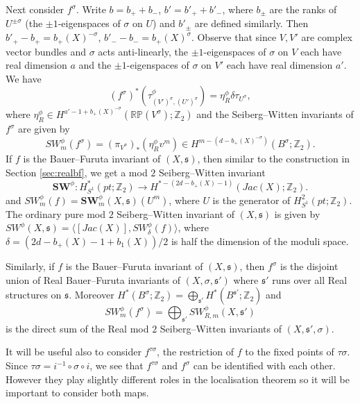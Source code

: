 \documentclass{amsart}
\theoremstyle{definition}
\theoremstyle{remark}
\numberwithin{equation}{section}
\begin{document}
Next consider $f^\sigma$. Write $b = b_+ + b_-$, $b' = b'_+ + b'_-$, where $b_{\pm}$ are the ranks of $U^{\pm \sigma}$ (the $\pm 1$-eigenspaces of $\sigma$ on $U$) and $b'_{\pm}$ are defined similarly. Then $b'_+ - b_+ = b_+(X)^{-\sigma}$, $b'_- - b_- = b_+(X)^{\sigma}$. Observe that since $V,V'$ are complex vector bundles and $\sigma$ acts anti-linearly, the $\pm 1$-eigenspaces of $\sigma$ on $V$ each have real dimension $a$ and the $\pm 1$-eigenspaces of $\sigma$ on $V'$ each have real dimension $a'$. We have 
\[
(f^\sigma)^*( \tau^\phi_{(V')^\sigma , (U')^\sigma} ) = \eta^\phi_R \delta \tau_{U^\sigma},
\]
where $\eta^\phi_R \in H^{a'-1+b_+(X)^{-\sigma}}( \mathbb{RP}(V^\sigma) ; \mathbb{Z}_2)$ and the Seiberg--Witten invariants of $f^\sigma$ are given by 
\[
SW^\phi_m(f^\sigma) = (\pi_{V^\sigma})_*( \eta^\phi_R v^m ) \in H^{m - (d-b_+(X)^{-\sigma})}( B^\sigma ; \mathbb{Z}_2).
\]
If $f$ is the Bauer--Furuta invariant of $(X , \mathfrak{s})$, then similar to the construction in Section \ref{sec:realbf}, we get a mod $2$ Seiberg--Witten invariant
\[
\mathbf{SW}^\phi : H^*_{S^1}(pt ; \mathbb{Z}_2) \to H^{*-(2d-b_+(X)-1)}(Jac(X) ; \mathbb{Z}_2).
\]
and $SW^\phi_m(f) = \mathbf{SW}^\phi_m(X,\mathfrak{s})(U^m)$, where $U$ is the generator of $H^2_{S^1}(pt ; \mathbb{Z}_2)$. The ordinary pure mod $2$ Seiberg--Witten invariant of $(X,\mathfrak{s})$ is given by $SW^\phi(X,\mathfrak{s}) = \langle [Jac(X)] , SW^\phi_\delta(f) \rangle$, where $\delta = (2d - b_+(X) - 1 + b_1(X))/2$ is half the dimension of the moduli space.

Similarly, if $f$ is the Bauer--Furuta invariant of $(X,\mathfrak{s})$, then $f^\sigma$ is the disjoint union of Real Bauer--Furuta invariants of $(X,\sigma , \mathfrak{s}')$ where $\mathfrak{s}'$ runs over all Real structures on $\mathfrak{s}$. Moreover $H^*( B^\sigma ; \mathbb{Z}_2) = \bigoplus_{\mathfrak{s}'} H^*( B^{\mathfrak{s}'} ; \mathbb{Z}_2)$ and 
\[
SW^\phi_m(f^\sigma) = \bigoplus_{\mathfrak{s}'} SW^\phi_{R,m}(X,\mathfrak{s}')
\]
is the direct sum of the Real mod $2$ Seiberg--Witten invariants of $(X,\mathfrak{s}',\sigma)$.

It will be useful also to consider $f^{\tau \sigma}$, the restriction of $f$ to the fixed points of $\tau \sigma$. Since $\tau \sigma = i^{-1} \circ \sigma \circ i$, we see that $f^{\tau \sigma}$ and $f^{\sigma}$ can be identified with each other. However they play slightly different roles in the localisation theorem so it will be important to consider both maps.
\end{document}

